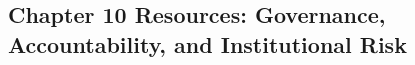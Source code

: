 \begin{refsection}
\chapter{Chapter 10 Resources: Governance, Accountability, and Institutional Risk}
\label{chap:comp-ch10}



\printbibliography[heading=subbibliography,title={Chapter 10 References}]
\end{refsection}
